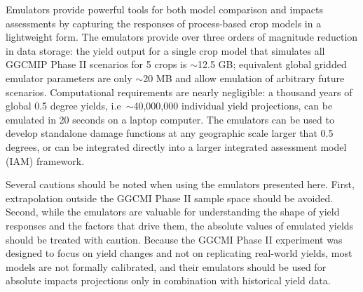 \documentclass[gmdd]{copernicus} %
\begin{document}

Emulators provide powerful tools for both model comparison and impacts assessments by capturing the responses of process-based crop models in a lightweight form. The emulators provide over three orders of magnitude reduction in data storage: the yield output for a single crop model that simulates all GGCMIP Phase II scenarios for 5 crops is $\sim$12.5 GB; equivalent global gridded emulator parameters are only $\sim$20 MB and allow emulation of arbitrary future scenarios. Computational requirements are nearly negligible: a thousand years of global 0.5 degree yields, i.e\ $\sim$40,000,000 individual yield projections, can be emulated in 20 seconds on a laptop computer. 
The emulators can be used to develop standalone damage functions at any geographic scale larger that 0.5 degrees, or can be integrated directly into a larger integrated assessment model (IAM) framework. 

Several cautions should be noted when using the emulators presented here. 
First, extrapolation outside the GGCMI Phase II sample space should be avoided. %
Second, while the emulators are valuable for understanding the shape of yield responses and the factors that drive them, the absolute values of emulated yields should be treated with caution. Because the GGCMI Phase II experiment was designed to focus on yield changes and not on replicating real-world yields, most models are not formally calibrated, and their
emulators should be used for absolute impacts projections only in combination with historical yield data. 
\end{document}
